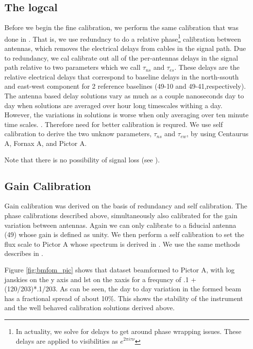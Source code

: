 \documentclass[twocolumn,numberedappendix]{emulateapj}
\begin{document}
\subsection{The logcal}
Before we begin the fine calibration, we perform the same calibration that was
done in \citep{parsons2014}. That is, we use redundncy to do a relative
phase\footnote{In actuality, we solve for delays to get around phase wrapping
issues. These delays are applied to visibilities as $e^{2\pi{i}\tau\nu}$}
calibration between antennas, which removes the electrical delays from cables
in the signal path. Due to redundancy, we cal calibrate out all of the
per-antennas delays in the signal path relative to two parameters which we call
$\tau_{ns}$ and $\tau_{es}$. These delays are the relative electrical delays
that correspond to baseline delays in the north-ssouth and east-west component
for 2 reference baselines (49-10 and 49-41,respectively). The antenna based
delay solutions vary as much as a couple nanoseconds day to day when solutions
are averaged over hour long timescales withing a day. However, the variations in
solutions is worse when only averaging over ten minute time scales. . Therefore
need for better calibration is requred.  We use self calibration to derive the
two unknow parameters, $\tau_{ns}$ and $\tau_{ew}$, by using Centaurus A, Fornax
A, and Pictor A.

Note that there is no possibility of signal loss (see \citep{parsons2014}).

\subsection{Gain Calibration}
Gain calibration was derived on the basis of redundancy and self calibration.
The phase calibrations described above, simultaneously also calibrated for the
gain variation between antennas. Again we can only calibrate to a fiducial
antenna (49) whose gain is defined as unity. We then perform a self calibration
to set the flux scale to Pictor A whose spectrum is derived in
\citep{jacops_2013}. We use the same methods describes in \citep{Parsons 2014}.

Figure \ref{fig:bmfom_pic} shows that dataset beamformed to Pictor A, with log
janskies on the y axis and lst on the xaxis for a frequncy of .1 + (120/203)*.1/203. 
As can be seen, the day to day variation in the formed beam has a fractional
spread of about 10$\%$.  This shows the stability of the instrument and the well
behaved calibration solutions derived above. 
\end{document}
